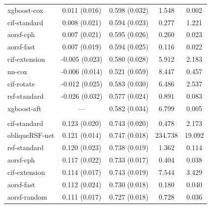 \documentclass[12pt]{article}\usepackage[]{graphicx}\usepackage[]{xcolor}
\newenvironment{knitrout}{}{} %
\begin{document}
\begin{knitrout}
\begin{longtable}[t]{lcccc}
\hspace{1em}xgboost-cox & 0.011 (0.016) & 0.598 (0.032) & 1.548 & 0.002\\
\hspace{1em}cif-standard & 0.008 (0.021) & 0.594 (0.023) & 0.277 & 1.221\\
\hspace{1em}aorsf-cph & 0.007 (0.021) & 0.595 (0.026) & 0.260 & 0.023\\
\hspace{1em}aorsf-fast & 0.007 (0.019) & 0.594 (0.025) & 0.116 & 0.022\\
\hspace{1em}cif-extension & -0.005 (0.023) & 0.580 (0.028) & 5.912 & 2.183\\
\hspace{1em}nn-cox & -0.006 (0.014) & 0.521 (0.059) & 8.447 & 0.457\\
\hspace{1em}cif-rotate & -0.012 (0.025) & 0.583 (0.030) & 6.486 & 2.537\\
\hspace{1em}rsf-standard & -0.026 (0.032) & 0.577 (0.024) & 0.891 & 0.083\\
\hspace{1em}xgboost-aft & --- & 0.582 (0.034) & 6.799 & 0.005\\
\addlinespace[0.3em]
\multicolumn{5}{l}{\textit{\textbf{GBSG II; recurrence or death, n = 686, p = 10}}}\\
\hline
\hspace{1em}cif-standard & 0.123 (0.020) & 0.743 (0.020) & 0.478 & 2.173\\
\hspace{1em}obliqueRSF-net & 0.121 (0.014) & 0.747 (0.018) & 234.738 & 19.092\\
\hspace{1em}rsf-standard & 0.120 (0.023) & 0.738 (0.019) & 1.362 & 0.114\\
\hspace{1em}aorsf-cph & 0.117 (0.022) & 0.733 (0.017) & 0.404 & 0.038\\
\hspace{1em}cif-extension & 0.114 (0.017) & 0.743 (0.019) & 7.544 & 3.429\\
\hspace{1em}aorsf-fast & 0.112 (0.024) & 0.730 (0.018) & 0.180 & 0.040\\
\hspace{1em}aorsf-random & 0.111 (0.017) & 0.727 (0.018) & 0.728 & 0.036\\

\end{longtable}
\end{knitrout}
\end{document}
